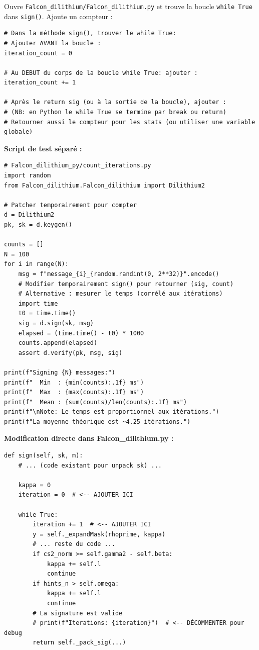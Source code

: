 \documentclass[12pt, a4paper]{article}
\begin{document}
\begin{solution}
Ouvre \texttt{Falcon\_dilithium/Falcon\_dilithium.py} et trouve la boucle \texttt{while True} dans \texttt{sign()}.
Ajoute un compteur :

\begin{lstlisting}[style=python]
# Dans la méthode sign(), trouver le while True:
# Ajouter AVANT la boucle :
iteration_count = 0

# Au DEBUT du corps de la boucle while True: ajouter :
iteration_count += 1

# Après le return sig (ou à la sortie de la boucle), ajouter :
# (NB: en Python le while True se termine par break ou return)
# Retourner aussi le compteur pour les stats (ou utiliser une variable globale)
\end{lstlisting}

\textbf{Script de test séparé :}
\begin{lstlisting}[style=python]
# Falcon_dilithium_py/count_iterations.py
import random
from Falcon_dilithium.Falcon_dilithium import Dilithium2

# Patcher temporairement pour compter
d = Dilithium2
pk, sk = d.keygen()

counts = []
N = 100
for i in range(N):
    msg = f"message_{i}_{random.randint(0, 2**32)}".encode()
    # Modifier temporairement sign() pour retourner (sig, count)
    # Alternative : mesurer le temps (corrélé aux itérations)
    import time
    t0 = time.time()
    sig = d.sign(sk, msg)
    elapsed = (time.time() - t0) * 1000
    counts.append(elapsed)
    assert d.verify(pk, msg, sig)

print(f"Signing {N} messages:")
print(f"  Min  : {min(counts):.1f} ms")
print(f"  Max  : {max(counts):.1f} ms")
print(f"  Mean : {sum(counts)/len(counts):.1f} ms")
print(f"\nNote: Le temps est proportionnel aux itérations.")
print(f"La moyenne théorique est ~4.25 itérations.")
\end{lstlisting}

\textbf{Modification directe dans Falcon\_dilithium.py :}
\begin{lstlisting}[style=python]
def sign(self, sk, m):
    # ... (code existant pour unpack sk) ...

    kappa = 0
    iteration = 0  # <-- AJOUTER ICI

    while True:
        iteration += 1  # <-- AJOUTER ICI
        y = self._expandMask(rhoprime, kappa)
        # ... reste du code ...
        if cs2_norm >= self.gamma2 - self.beta:
            kappa += self.l
            continue
        if hints_n > self.omega:
            kappa += self.l
            continue
        # La signature est valide
        # print(f"Iterations: {iteration}")  # <-- DÉCOMMENTER pour debug
        return self._pack_sig(...)
\end{lstlisting}
\end{solution}
\end{document}
